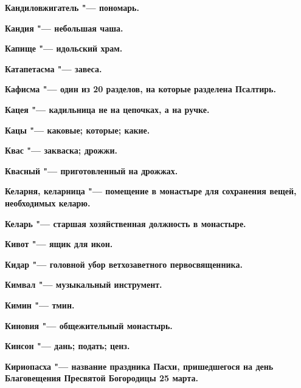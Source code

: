 \begin{multicols}{2}
\bfseries Кандиловжигатель\normalfont{} "--- пономарь. 




\bfseries Кандия\normalfont{} "--- небольшая чаша. 




\bfseries Капище\normalfont{} "--- идольский храм. 




\bfseries Катапетасма\normalfont{} "--- завеса. 




\bfseries Кафисма\normalfont{} "--- один из 20 разделов, на которые разделена Псалтирь. 




\bfseries Кацея\normalfont{} "--- кадильница не на цепочках, а на ручке. 




\bfseries Кацы\normalfont{} "--- каковые; которые; какие. 




\bfseries Квас\normalfont{} "--- закваска; дрожжи. 




\bfseries Квасный\normalfont{} "--- приготовленный на дрожжах. 




\bfseries Келарня, келарница\normalfont{} "--- помещение в монастыре для сохранения вещей, необходимых келарю. 




\bfseries Келарь\normalfont{} "--- старшая хозяйственная должность в монастыре. 




\bfseries Кивот\normalfont{} "--- ящик для икон. 




\bfseries Кидар\normalfont{} "--- головной убор ветхозаветного первосвященника. 




\bfseries Кимвал\normalfont{} "--- музыкальный инструмент. 




\bfseries Кимин\normalfont{} "--- тмин. 




\bfseries Киновия\normalfont{} "--- общежительный монастырь. 




\bfseries Кинсон\normalfont{} "--- дань; подать; ценз. 




\bfseries Кириопасха\normalfont{} "--- название праздника Пасхи, пришедшегося на день Благовещения Пресвятой Богородицы 25 марта. 





\end{multicols}
